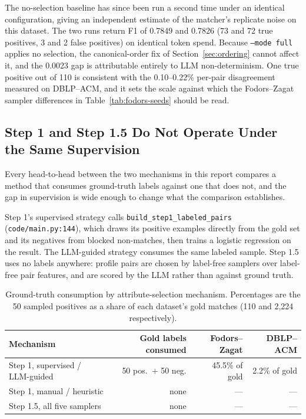\documentclass[11pt]{article}
\begin{document}
The no-selection baseline has since been run a second time under an identical
configuration, giving an independent estimate of the matcher's replicate noise on this
dataset. The two runs return F1 of 0.7849 and 0.7826 (73 and 72 true positives, 3 and
2 false positives) on identical token spend. Because \texttt{--mode full} applies no
selection, the canonical-order fix of Section~\ref{sec:ordering} cannot affect it, and
the 0.0023 gap is attributable entirely to LLM non-determinism. One true positive out
of 110 is consistent with the 0.10--0.22\% per-pair disagreement measured on
DBLP--ACM, and it sets the scale against which the Fodors--Zagat sampler differences
in Table~\ref{tab:fodors-seeds} should be read.

\subsection{Step 1 and Step 1.5 Do Not Operate Under the Same Supervision}
\label{sec:supervision}

Every head-to-head between the two mechanisms in this report compares a method that
consumes ground-truth labels against one that does not, and the gap in supervision is
wide enough to change what the comparison establishes.

Step 1's supervised strategy calls \texttt{build\_step1\_labeled\_pairs}
(\texttt{code/main.py:144}), which draws its positive examples directly from the gold
set and its negatives from blocked non-matches, then trains a logistic regression on
the result. The LLM-guided strategy consumes the same labeled sample. Step 1.5 uses no
labels anywhere: profile pairs are chosen by label-free samplers over label-free pair
features, and are scored by the LLM rather than against ground truth.

\begin{table}[htbp]
\centering
\small
\begin{tabular}{lrrr}
\toprule
Mechanism & Gold labels consumed & Fodors--Zagat & DBLP--ACM \\
\midrule
Step 1, supervised / LLM-guided & 50 pos.\ $+$ 50 neg. & 45.5\% of gold & 2.2\% of gold \\
Step 1, manual / heuristic & none & --- & --- \\
Step 1.5, all five samplers & none & --- & --- \\
\bottomrule
\end{tabular}
\caption{Ground-truth consumption by attribute-selection mechanism. Percentages are
the 50 sampled positives as a share of each dataset's gold matches (110 and 2{,}224
respectively).}
\label{tab:supervision}
\end{table}
\end{document}
